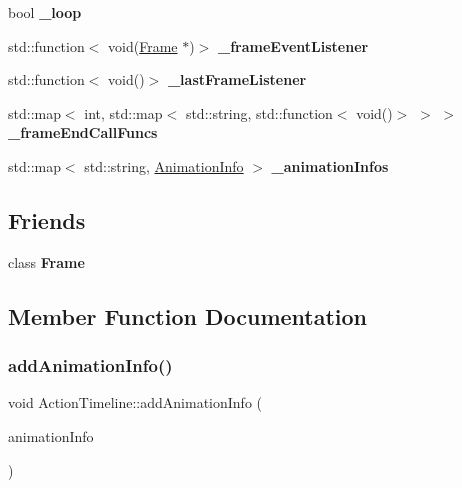 \begin{DoxyCompactItemize}
\item 
\mbox{\label{classActionTimeline_a542fdf2d4602c30c8951a459e8dae6b8}} 
bool {\bfseries \+\_\+loop}
\item 
\mbox{\label{classActionTimeline_af83fdf8a944e4761fb822fdd8c930c66}} 
std\+::function$<$ void(\hyperlink{classFrame}{Frame} $\ast$)$>$ {\bfseries \+\_\+frame\+Event\+Listener}
\item 
\mbox{\label{classActionTimeline_a0ff03bc1a9d782c5e240d4332a3a6d9d}} 
std\+::function$<$ void()$>$ {\bfseries \+\_\+last\+Frame\+Listener}
\item 
\mbox{\label{classActionTimeline_a1de73dc407e2aa659ae2bb015db71695}} 
std\+::map$<$ int, std\+::map$<$ std\+::string, std\+::function$<$ void()$>$ $>$ $>$ {\bfseries \+\_\+frame\+End\+Call\+Funcs}
\item 
\mbox{\label{classActionTimeline_a1224221cad8d2f7f79d169b3e885c6bc}} 
std\+::map$<$ std\+::string, \hyperlink{structAnimationInfo}{Animation\+Info} $>$ {\bfseries \+\_\+animation\+Infos}
\end{DoxyCompactItemize}
\subsection*{Friends}
\begin{DoxyCompactItemize}
\item 
\mbox{\label{classActionTimeline_a1a3c9a246bb17ddd6d40809f3521a5c5}} 
class {\bfseries Frame}
\end{DoxyCompactItemize}


\subsection{Member Function Documentation}
\mbox{\label{classActionTimeline_a3a41ddf4a9772663b6f56f9e7347e0ff}} 
\subsubsection{\texorpdfstring{add\+Animation\+Info()}{addAnimationInfo()}\hspace{0.1cm}{\footnotesize\ttfamily [1/2]}}
{\footnotesize\ttfamily void Action\+Timeline\+::add\+Animation\+Info (\begin{DoxyParamCaption}\item[{const \hyperlink{structAnimationInfo}{Animation\+Info} \&}]{animation\+Info }\end{DoxyParamCaption})\hspace{0.3cm}{\ttfamily [virtual]}}

